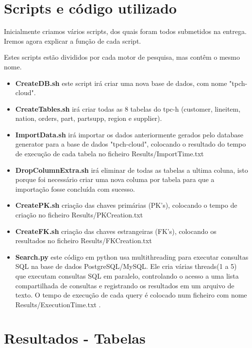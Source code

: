 \documentclass{article}
\begin{document}
\section{Scripts e código utilizado}
\texttt{}\par Inicialmente criamos vários scripts, dos quais foram todos submetidos na entrega. Iremos agora explicar a função de cada script.\\

\texttt{}\par Estes scripts estão divididos por cada motor de pesquisa, mas contêm o mesmo nome.\\

\begin{itemize}
    \item \textbf{CreateDB.sh} este script irá criar uma nova base de dados, com nome "tpch-cloud".
    \item \textbf{CreateTables.sh} irá criar todas as 8 tabelas do tpc-h (customer, lineitem, nation, orders, part, partsupp, region e supplier).
    \item \textbf{ImportData.sh} irá importar os dados anteriormente gerados pelo database generator para a base de dados "tpch-cloud", colocando o resultado do tempo de execução de cada tabela no ficheiro Results/ImportTime.txt
    \item \textbf{DropColumnExtra.sh} irá eliminar de todas as tabelas a ultima coluna, isto porque foi necessário criar uma nova columa por tabela para que a importação fosse concluída com sucesso.
    \item \textbf{CreatePK.sh} criação das chaves primárias (PK's), colocando o tempo de criação no ficheiro Results/PKCreation.txt
    \item \textbf{CreateFK.sh} criação das chaves estrangeiras (FK's), colocando os resultados no ficheiro Results/FKCreation.txt
    \item \textbf{Search.py} este código em python usa multithreading para executar consultas SQL na base de dados PostgreSQL/MySQL. Ele cria várias threads(1 a 5) que executam consultas SQL em paralelo, controlando o acesso a uma lista compartilhada de consultas e registrando os resultados em um arquivo de texto. O tempo de execução de cada query é colocado num ficheiro com nome Results/ExecutionTime.txt .
     
\end{itemize}

\clearpage

\section{Resultados - Tabelas}
\end{document}
